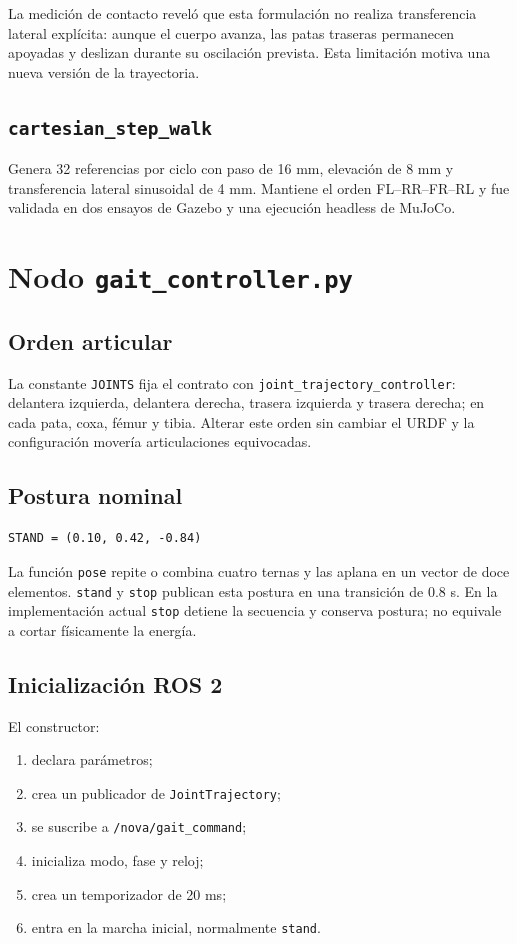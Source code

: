 \documentclass[11pt,a4paper]{article}
\begin{document}
La medición de contacto reveló que esta formulación no realiza transferencia
lateral explícita: aunque el cuerpo avanza, las patas traseras permanecen
apoyadas y deslizan durante su oscilación prevista. Esta limitación motiva una
nueva versión de la trayectoria.

\subsection{\texttt{cartesian\_step\_walk}}
Genera 32 referencias por ciclo con paso de 16 mm, elevación de 8 mm y
transferencia lateral sinusoidal de 4 mm. Mantiene el orden FL--RR--FR--RL y
fue validada en dos ensayos de Gazebo y una ejecución headless de MuJoCo.

\section{Nodo \texttt{gait\_controller.py}}
\subsection{Orden articular}
La constante \texttt{JOINTS} fija el contrato con
\texttt{joint\_trajectory\_controller}: delantera izquierda, delantera derecha,
trasera izquierda y trasera derecha; en cada pata, coxa, fémur y tibia. Alterar
este orden sin cambiar el URDF y la configuración movería articulaciones
equivocadas.

\subsection{Postura nominal}
\begin{lstlisting}[style=python]
STAND = (0.10, 0.42, -0.84)
\end{lstlisting}
La función \texttt{pose} repite o combina cuatro ternas y las aplana en un
vector de doce elementos. \texttt{stand} y \texttt{stop} publican esta postura
en una transición de $0.8$ s. En la implementación actual \texttt{stop} detiene
la secuencia y conserva postura; no equivale a cortar físicamente la energía.

\subsection{Inicialización ROS 2}
El constructor:
\begin{enumerate}
\item declara parámetros;
\item crea un publicador de \texttt{JointTrajectory};
\item se suscribe a \texttt{/nova/gait\_command};
\item inicializa modo, fase y reloj;
\item crea un temporizador de 20 ms;
\item entra en la marcha inicial, normalmente \texttt{stand}.
\end{enumerate}
\end{document}
